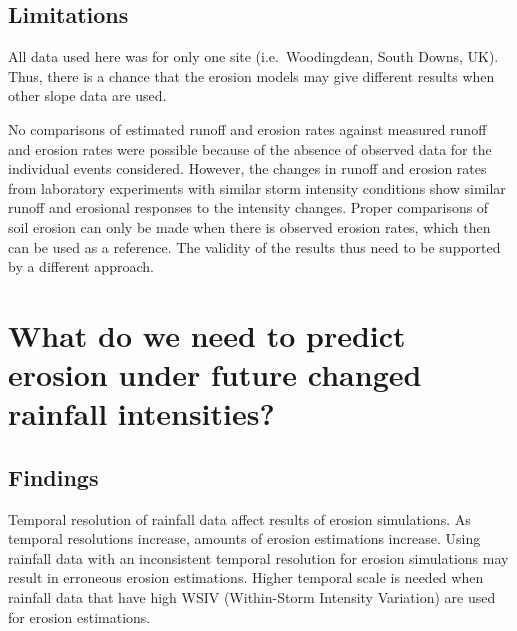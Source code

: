 \subsection{Limitations}
\label{sec:LimitationsStage1}

All data used here was for only one site (i.e.\ Woodingdean, South Downs, UK).
Thus, there is a chance that the erosion models may give different results when
other slope data are used.

No comparisons of estimated runoff and erosion rates against measured runoff and
erosion rates were possible because of the absence of observed data for the
individual events considered. However, the changes in runoff and erosion rates
from laboratory experiments with similar storm intensity conditions show similar
runoff and erosional responses to the intensity changes. Proper comparisons of
soil erosion can only be made when there is observed erosion rates, which then
can be used as a reference. The validity of the results thus need to be
supported by a different approach.


\section{What do we need to predict erosion under future changed rainfall
intensities?}
\label{sec:WeNeedToPredictErosionUnderFutureChangedRainfallIntensities}
\subsection{Findings}
\label{sec:FindingsStage2}
Temporal resolution of rainfall data affect results of erosion simulations. As
temporal resolutions increase, amounts of erosion estimations increase. Using
rainfall data with an inconsistent temporal resolution for erosion simulations
may result in erroneous erosion estimations. Higher temporal scale is needed
when rainfall data that have high WSIV (Within-Storm Intensity Variation) are
used for erosion estimations.

